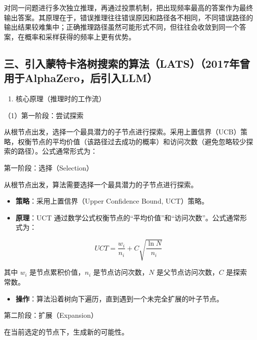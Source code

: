 对同一问题进行多次独立推理，再通过投票机制，把出现频率最高的答案作为最终输出答案。其原理在于，错误推理往往错误原因和路径各不相同，不同错误路径的输出结果较难集中；正确推理路径虽然可能形式不同，但往往会收敛到同一个答案，在概率和采样获得的频率上更有优势。

\hypertarget{ux4e09ux5f15ux5165ux8499ux7279ux5361ux6d1bux6811ux641cux7d22ux7684ux7b97ux6cd5lats2017ux5e74ux66feux7528ux4e8ealphazeroux540eux5f15ux5165llm}{%
\subsection{三、引入蒙特卡洛树搜索的算法（LATS）（2017年曾用于AlphaZero，后引入LLM）}\label{ux4e09ux5f15ux5165ux8499ux7279ux5361ux6d1bux6811ux641cux7d22ux7684ux7b97ux6cd5lats2017ux5e74ux66feux7528ux4e8ealphazeroux540eux5f15ux5165llm}}

\begin{enumerate}
\def\labelenumi{\arabic{enumi}.}
\tightlist
\item
  核心原理（推理时的工作流）
\end{enumerate}

（1）第一阶段：尝试探索

从根节点出发，选择一个最具潜力的子节点进行探索。采用上置信界（UCB）策略，权衡节点的平均价值（该路径过去成功的概率）和访问次数（避免忽略较少探索的路径）。公式通常形式为：

第一阶段：选择（Selection）

从根节点出发，算法需要选择一个最具潜力的子节点进行探索。

\begin{itemize}
\tightlist
\item
  \textbf{策略}：采用上置信界（Upper Confidence Bound, UCT）策略。
\item
  \textbf{原理}：UCT 通过数学公式权衡节点的``平均价值''和``访问次数''。公式通常形式为：
\end{itemize}

\[
UCT=\frac{w_i}{n_i}+C\sqrt{\frac{\ln N}{n_i}}
\]

其中 \(w_i\) 是节点累积价值，\(n_i\) 是节点访问次数，\(N\) 是父节点访问次数，\(C\) 是探索常数。

\begin{itemize}
\tightlist
\item
  \textbf{操作}：算法沿着树向下遍历，直到遇到一个未完全扩展的叶子节点。
\end{itemize}

第二阶段：扩展（Expansion）

在当前选定的节点下，生成新的可能性。


